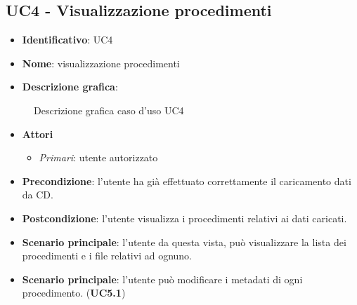 
\subsection{UC4 - Visualizzazione procedimenti}
\begin{itemize}
  \item \textbf{Identificativo}: UC4
  \item \textbf{Nome}: visualizzazione procedimenti
  \item \textbf{Descrizione grafica}:
\end{itemize}

\begin{figure}[H]
  \centering
  \caption{Descrizione grafica caso d'uso UC4}
\end{figure}

\begin{itemize}
  \item \textbf{Attori}
        \begin{itemize}
          \item \textit{Primari}: utente autorizzato
        \end{itemize}
  \item \textbf{Precondizione}: l'utente ha già effettuato correttamente il caricamento dati da CD.
  \item \textbf{Postcondizione}: l'utente visualizza i procedimenti relativi ai dati caricati.
  \item \textbf{Scenario principale}: l'utente da questa vista, può visualizzare la lista dei procedimenti e i file relativi ad ognuno.
  \item \textbf{Scenario principale}: l'utente può modificare i metadati di ogni procedimento. (\textbf{UC5.1})
\end{itemize}